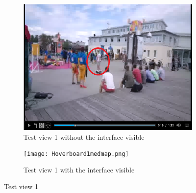 \begin{figure}
\begin{subfigure}[b]{0.5\textwidth}
 	\includegraphics[width=\linewidth]{Hoverboard_1.png}
  	\caption{Test view 1 without the interface visible}\label{fig:testview1A}
    \end{subfigure}\hfill 
    \hspace{3px}
    \begin{subfigure}[b]{0.5\textwidth}
	\texttt{[image: Hoverboard1medmap.png]}
  	\caption{Test view 1 with the interface visible}\label{fig:testview1B}
    \end{subfigure}
	\caption{Test view 1}
	\label{fig:testview1}
\end{figure}

